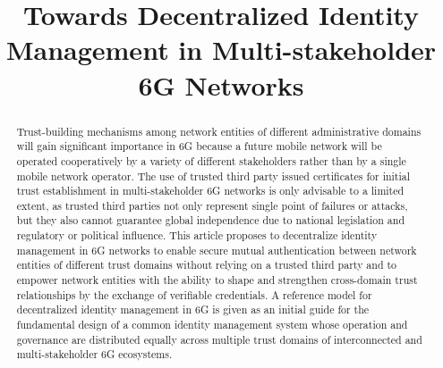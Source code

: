 \documentclass[conference]{IEEEtran}
\begin{document}

\title{Towards Decentralized Identity Management in Multi-stakeholder 6G Networks\\
{\footnotesize }
}

\author{
	\and
	\and
}

\newcommand{\ts}{\textsuperscript}

\maketitle

\begin{abstract}

Trust-building mechanisms among network entities of different administrative domains will gain significant importance in 6G because a future mobile network will be operated cooperatively by a variety of different stakeholders rather than by a single mobile network operator. The use of trusted third party issued certificates for initial trust establishment in multi-stakeholder 6G networks is only advisable to a limited extent, as trusted third parties not only represent single point of failures or attacks, but they also cannot guarantee global independence due to national legislation and regulatory or political influence. This article proposes to decentralize identity management in 6G networks to enable secure mutual authentication between network entities of different trust domains without relying on a trusted third party and to empower network entities with the ability to shape and strengthen cross-domain trust relationships by the exchange of verifiable credentials. A reference model for decentralized identity management in 6G is given as an initial guide for the fundamental design of a common identity management system whose operation and governance are distributed equally across multiple trust domains of interconnected and multi-stakeholder 6G ecosystems.  

\end{abstract}
\end{document}

